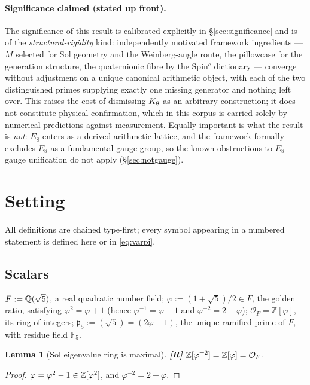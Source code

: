 \documentclass[11pt,a4paper]{article}
\theoremstyle{plain}
\newtheorem{lemma}{Lemma}
\theoremstyle{definition}
\theoremstyle{remark}
\newcommand{\Zphi}{\mathbb{Z}[\varphi]}
\newcommand{\FF}[1]{\mathbb{F}_{#1}}
\newcommand{\pfive}{\mathfrak{p}_5}
\newcommand{\rtag}[1]{\textnormal{\textbf{[#1]}}}
\begin{document}
\paragraph{Significance claimed (stated up front).}
The significance of this result is calibrated explicitly in \S\ref{sec:significance} and is of the \emph{structural-rigidity} kind: independently motivated framework ingredients --- $M$ selected for Sol geometry and the Weinberg-angle route, the pillowcase for the generation structure, the quaternionic fibre by the Spin$^c$ dictionary --- converge without adjustment on a unique canonical arithmetic object, with each of the two distinguished primes supplying exactly one missing generator and nothing left over. This raises the cost of dismissing $K_8$ as an arbitrary construction; it does not constitute physical confirmation, which in this corpus is carried solely by numerical predictions against measurement. Equally important is what the result is \emph{not}: $E_8$ enters as a derived arithmetic lattice, and the framework formally excludes $E_8$ as a fundamental gauge group, so the known obstructions to $E_8$ gauge unification do not apply (\S\ref{sec:notgauge}).

\section{Setting}\label{sec:setting}

All definitions are chained type-first; every symbol appearing in a numbered statement is defined here or in \eqref{eq:varpi}.

\subsection{Scalars}\label{sec:scalars}

$F := \mathbb{Q}(\sqrt5)$, a real quadratic number field; $\varphi := (1+\sqrt5)/2 \in F$, the golden ratio, satisfying $\varphi^2 = \varphi + 1$ (hence $\varphi^{-1} = \varphi - 1$ and $\varphi^{-2} = 2 - \varphi$); $\mathcal{O}_F = \Zphi$, its ring of integers; $\pfive := (\sqrt5) = (2\varphi - 1)$, the unique ramified prime of $F$, with residue field $\FF{5}$.

\setcounter{lemma}{-1}
\begin{lemma}[Sol eigenvalue ring is maximal]\label{lem:ring}
\rtag{R} $\Z[\varphi^{\pm2}] = \Zphi = \mathcal{O}_F$.
\end{lemma}
\begin{proof}
$\varphi = \varphi^2 - 1 \in \mathbb{Z}[\varphi^2]$, and $\varphi^{-2} = 2 - \varphi$.
\end{proof}
\end{document}
